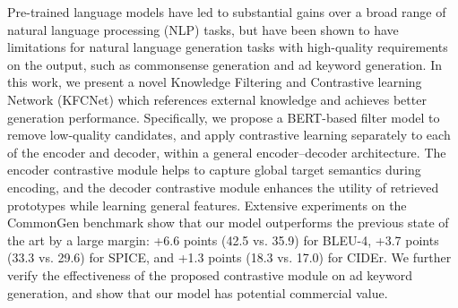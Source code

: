 Pre-trained language models have led to substantial gains over a broad range of natural language processing (NLP) tasks, but have been shown to have limitations for natural language generation tasks with high-quality requirements on the output, such as commonsense generation and ad keyword generation. In this work, we present a novel Knowledge Filtering and Contrastive learning Network (KFCNet) which references external knowledge and achieves better generation performance. Specifically, we propose a BERT-based filter model to remove low-quality candidates, and apply contrastive learning separately to each of the encoder and decoder, within a general encoder--decoder architecture. The encoder contrastive module helps to capture global target semantics during encoding, and the decoder contrastive module enhances the utility of retrieved prototypes while learning general features. Extensive experiments on the CommonGen benchmark show that our model outperforms the previous state of the art by a large margin: +6.6 points (42.5 vs. 35.9) for BLEU-4, +3.7 points (33.3 vs. 29.6) for SPICE, and +1.3 points (18.3 vs. 17.0) for CIDEr. We further verify the effectiveness of the proposed contrastive module on ad keyword generation, and show that our model has potential commercial value.
